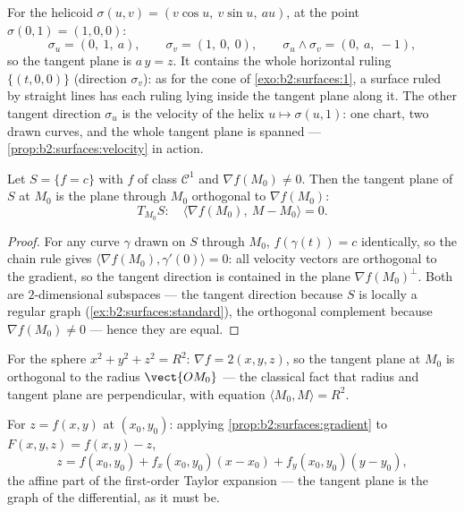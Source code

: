 \begin{example}
\label{ex:b2:surfaces:helicoidtangent}
For the helicoid $\sigma(u, v) = (v\cos u,\ v\sin u,\ au)$,
at the point $\sigma(0, 1) = (1, 0, 0)$:
\[
\sigma_u = (0,\ 1,\ a), \qquad \sigma_v = (1,\ 0,\ 0),
\qquad
\sigma_u \wedge \sigma_v = (0,\ a,\ -1),
\]
so the tangent plane is $a\,y = z$. It contains the whole
horizontal ruling $\{(t, 0, 0)\}$ (direction $\sigma_v$): as
for the cone of \cref{exo:b2:surfaces:1}, a surface ruled by
straight lines has each ruling lying inside the tangent
plane along it. The other tangent direction $\sigma_u$ is the
velocity of the helix $u \mapsto \sigma(u, 1)$: one chart,
two drawn curves, and the whole tangent plane is spanned ---
\cref{prop:b2:surfaces:velocity} in action.
\end{example}

\begin{proposition}\label{prop:b2:surfaces:gradient}
Let $S = \{f = c\}$ with $f$ of class $\mathcal{C}^1$ and $\nabla
f(M_0) \neq 0$. Then the tangent plane of $S$ at $M_0$ is the
plane through $M_0$ orthogonal to $\nabla f(M_0)$:
\[
T_{M_0}S :\quad
\langle \nabla f(M_0),\ M - M_0\rangle = 0 .
\]
\end{proposition}

\begin{proof}
For any curve $\gamma$ drawn on $S$ through $M_0$, $f(\gamma(t)) =
c$ identically, so the chain rule gives $\langle
\nabla f(M_0), \gamma'(0)\rangle = 0$: all velocity vectors are
orthogonal to the gradient, so the tangent direction is contained
in the plane $\nabla f(M_0)^\perp$. Both are $2$-dimensional
subspaces --- the tangent direction because $S$ is locally a
regular graph (\cref{ex:b2:surfaces:standard}), the orthogonal
complement because $\nabla f(M_0) \neq 0$ --- hence they are
equal.
\end{proof}

\begin{example}\label{ex:b2:surfaces:spheretangent}
For the sphere $x^2 + y^2 + z^2 = R^2$: $\nabla f = 2(x, y, z)$,
so the tangent plane at $M_0$ is orthogonal to the radius
$\vect{OM_0}$ --- the classical fact that radius and tangent plane
are perpendicular, with equation $\langle M_0, M\rangle = R^2$.
\end{example}

\begin{example}\label{ex:b2:surfaces:graphtangent}
For $z = f(x, y)$ at $(x_0, y_0)$: applying
\cref{prop:b2:surfaces:gradient} to $F(x,y,z) = f(x,y) - z$,
\[
z = f(x_0, y_0)
+ f_x(x_0, y_0)(x - x_0)
+ f_y(x_0, y_0)(y - y_0) ,
\]
the affine part of the first-order Taylor expansion --- the
tangent plane is the graph of the differential, as it must be.
\end{example}

